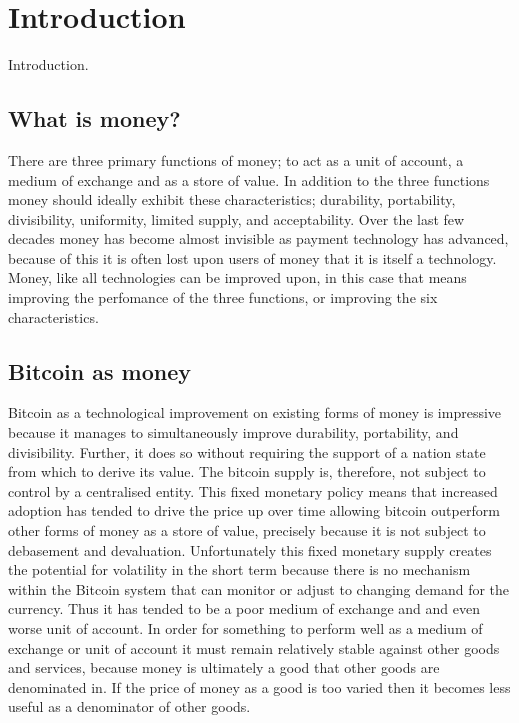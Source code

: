 \section{Introduction}

Introduction. \\

\subsection{What is money?}

There are three primary functions of money; to act as a unit of account, a medium of exchange and as a store of value. In addition to the three functions money should ideally exhibit these characteristics; durability, portability, divisibility, uniformity, limited supply, and acceptability. Over the last few decades money has become almost invisible as payment technology has advanced, because of this it is often lost upon users of money that it is itself a technology. Money, like all technologies can be improved upon, in this case that means improving the perfomance of the three functions, or improving the six characteristics.

\subsection{Bitcoin as money}

Bitcoin as a technological improvement on existing forms of money is impressive because it manages to simultaneously improve durability, portability, and divisibility. Further, it does so without requiring the support of a nation state from which to derive its value. The bitcoin supply is, therefore,  not subject to control by a centralised entity. This fixed monetary policy means that increased adoption has tended to drive the price up over time allowing bitcoin outperform other forms of money as a store of value, precisely because it is not subject to debasement and devaluation. Unfortunately this fixed monetary supply creates the potential for volatility in the short term because there is no mechanism within the Bitcoin system that can monitor or adjust to changing demand for the currency. Thus it has tended to be a poor medium of exchange and and even worse unit of account. In order for something to perform well as a medium of exchange or unit of account it must remain relatively stable against other goods and services, because money is ultimately a good that other goods are denominated in. If the price of money as a good is too varied then it becomes less useful as a denominator of other goods. \\

